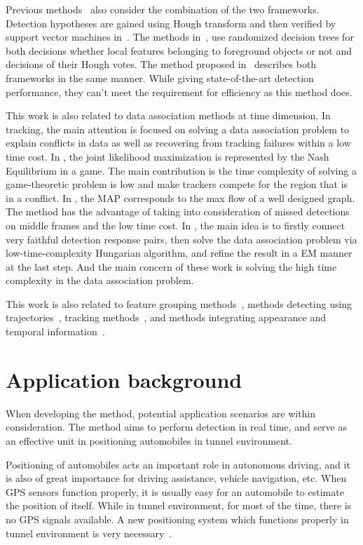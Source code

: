 Previous methods~\citep{ac34} also consider the combination of the two frameworks. Detection hypotheses are gained using Hough transform and then verified by support vector machines in~\citep{ac10,ac25}. The methods in~\citep{ac6,ac7}, use randomized decision trees for both decisions whether local features belonging to foreground objects or not and decisions of their Hough votes. The method proposed in~\citep{ac27} describes both frameworks in the same manner. While giving state-of-the-art detection performance, they can't meet the requirement for efficiency as this method does.

This work is also related to data association methods at time dimension. In tracking, the main attention is focused on solving a data
association problem to explain conflicts in data as well as
recovering from tracking failures within a low time cost. In
\citep{ij9}, the joint likelihood maximization is represented by the
Nash Equilibrium in a game. The main contribution is the time
complexity of solving a game-theoretic problem is low and make
trackers compete for the region that is in a conflict. In
\citep{ij10}, the MAP corresponds to the max flow of a well designed
graph. The method has the advantage of taking into consideration of
missed detections on middle frames and the low time cost. In
\citep{my7}, the main idea is to firstly connect very faithful
detection response pairs, then solve the data association problem
via low-time-complexity Hungarian algorithm, and refine the result
in a EM manner at the last step. And the main concern of these work
is solving the high time complexity in the data association problem.

 This work is also related to feature grouping methods~\citep{ac25}, methods detecting using trajectories~\citep{my9,ac24}, tracking methods~\citep{my7,my10}, and methods integrating appearance and temporal information~\citep{ac23}.


\section{Application background}
\label{ab}

When developing the method, potential application scenarios are within consideration. The method aims to perform detection in real time, and serve as an effective unit in positioning automobiles in tunnel environment.

Positioning of automobiles acts an important role in autonomous driving, and it is also of great importance for driving assistance, vehicle navigation, etc. When GPS sensors function properly, it is usually easy for an automobile to estimate the position of  itself. While in tunnel environment, for most of the time, there is no GPS signals available. A new positioning system which functions properly in tunnel environment is very necessary~\citep{nig}.

